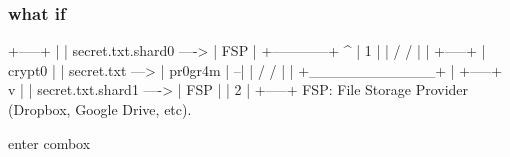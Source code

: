\begin{frame}[fragile]
  \frametitle{what if}

  {\tiny
  \begin{semiverbatim}
                                                             +-----+
                                                             |     |
                                  secret.txt.shard0   ---->  | FSP |
                   +------------+   ^                        |  1  |
                   |  /     /   |   |                        +-----+
                   |  crypt0    |   |
   secret.txt ---> |  pr0gr4m   | --|
                   | /     /    |   |
                   +____________+   |                        +-----+
                                    v                        |     |
                                  secret.txt.shard1   ---->  | FSP |
                                                             |  2  |
                                                             +-----+
FSP: File Storage Provider (Dropbox, Google Drive, etc).
  \end{semiverbatim}
  }

\end{frame}

\begin{frame}
  \centering
  enter combox
\end{frame}
